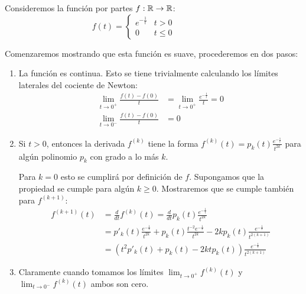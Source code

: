 \begin{example}\label{Ex: Función Indicadora}
	Consideremos la función por partes $f: \mathbb{R} \to \mathbb{R}$:
	\[ f(t) =
		\begin{cases}
			e^{-\frac{1}{t}} & t > 0    \\
			0                & t \leq 0
		\end{cases}
		\qquad \qquad
		\begin{gathered}
			
		\end{gathered}
	\]

	Comenzaremos mostrando que esta función es suave, procederemos en dos pasos:

	\begin{enumerate}
		\item La función es continua. Esto se tiene trivialmente calculando los límites laterales del cociente de Newton:
		      \begin{align*}
			      \lim_{t \to 0^+} \frac{f(t) - f(0)}{t} & = \lim_{t \to 0^+} \frac{e^{-\frac{1}{t}}}{t} = 0 \\
			      \lim_{t \to 0^-} \frac{f(t) - f(0)}{t} & = 0
		      \end{align*}
		\item Si $t > 0$, entonces la derivada $f^{(k)}$ tiene la forma $f^{(k)}(t) = p_k(t)\frac{e^{-\frac{1}{t}}}{t^{2k}}$ para algún polinomio $p_k$ con grado a lo más $k$.

		      Para $k = 0$ esto se cumplirá por definición de $f$. Supongamos que la propiedad se cumple para algún $k \geq 0$. Mostraremos que se cumple también para $f^{(k+1)}$:
		      \begin{align*}
			      f^{(k+1)}(t) & = \frac{d}{dt} f^{(k)}(t) = \frac{d}{dt} p_k(t) \frac{e^{-\frac{1}{t}}}{t^{2k}}                                                          \\
			                   & = p'_k(t) \frac{e^{-\frac{1}{t}}}{t^{2k}} + p_k(t) \frac{t^{-2} e^{-\frac{1}{t}}}{t^{2k}} - 2kp_k(t) \frac{e^{-\frac{1}{t}}}{t^{2(k+1)}} \\
			                   & = \left(t^2p'_k(t) + p_k(t) - 2ktp_k(t) \right) \frac{e^{-\frac{1}{t}}}{t^{2(k+1)}}
		      \end{align*}

		\item Claramente cuando tomamos los límites $\lim_{t \to 0^+} f^{(k)}(t)$ y $\lim_{t \to 0^-} f^{(k)}(t)$ ambos son cero.
	\end{enumerate}


\end{example}
